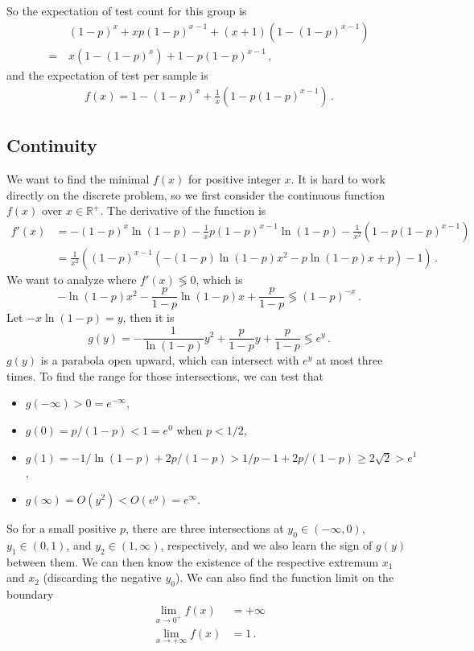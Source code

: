 \documentclass[]{article}
\begin{document}
So the expectation of test count for this group is
\begin{align*}
& (1-p)^x + xp(1-p)^{x - 1} + (x + 1)( 1 - (1-p)^{x - 1}) \\
=\,& x(1-(1-p)^x)  + 1 - p(1-p)^{x - 1}\,,
\end{align*}
and the expectation of test per sample is
\begin{align*}
f(x) = 1-(1-p)^x + \frac{1}{x}(1 - p(1-p)^{x - 1})\,.
\end{align*}
\subsection{Continuity}
We want to find the minimal $f(x)$ for positive integer $x$. It is hard to work directly on the discrete problem, so we first consider the continuous function $f(x)$ over $x \in \mathbb{R}^+$. The derivative of the function is
\begin{align*}
f'(x) &= -(1-p)^x \ln(1-p) - \frac{1}{x}p(1-p)^{x - 1}\ln(1-p) - \frac{1}{x^2}(1 - p(1-p)^{x - 1})\\
&= \frac{1}{x^2}( (1-p)^{x-1}(-(1-p)\ln(1-p)x^2 - p\ln(1-p)x + p) - 1 )\,.
\end{align*}
We want to analyze where $f'(x) \lessgtr 0$, which is
\[
-\ln(1-p)x^2 - \frac{p}{1-p}\ln(1-p)x + \frac{p}{1-p} \lessgtr (1-p)^{-x}\,.
\]
Let $-x\ln(1-p) = y$, then it is 
\[
g(y) = -\frac{1}{\ln(1-p)}y^2 +\frac{p}{1-p}y +\frac{p}{1-p} \lessgtr e^y\,.
\]
$g(y)$ is a parabola open upward, which can intersect with $e^y$ at most three times. To find the range for those intersections, we can test that
\begin{itemize}
	\item $g(-\infty) > 0 = e^{-\infty}$,
	\item $g(0) = p/(1 - p) < 1 = e^0$ when $p < 1/2$, 
	\item $g(1) = -1/\ln(1-p) + 2p/(1-p)> 1/p-1+2p/(1-p) \ge 2\sqrt{2} > e^1$, 
	\item $g(\infty) = O(y^2) < O(e^y) = e^{\infty}$.
\end{itemize}
So for a small positive $p$, there are three intersections at $y_0\in(-\infty, 0)$, $y_1\in(0, 1)$, and $y_2\in(1, \infty)$, respectively, and we also learn the sign of $g(y)$ between them. We can then know the existence of the respective extremum $x_1$ and $x_2$ (discarding the negative  $y_0$). We can also find the function limit on the boundary
\begin{align*}
\lim_{x\to0^+} f(x) &= +\infty\\
\lim_{x\to+\infty} f(x) &= 1\,.
\end{align*}
\end{document}
